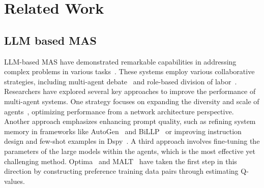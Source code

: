 \section{Related Work}
\label{section:relatedwork}



\subsection{LLM based MAS}
\label{subsection:LLM based MAS}
LLM-based MAS have demonstrated remarkable capabilities in addressing complex problems in various tasks~\cite{DBLP:conf/iclr/HongZCZCWZWYLZR24, DBLP:conf/acl/IslamAP24, tran2025multiagentcollaborationmechanismssurvey}. These systems employ various collaborative strategies, including multi-agent debate~\cite{DBLP:conf/icml/Du00TM24, DBLP:conf/emnlp/Liang0JW00Y0T24} and role-based division of labor~\cite{DBLP:journals/corr/abs-2405-04219, DBLP:conf/naacl/WangMW0WJ24}. 
Researchers have explored several key approaches to improve the performance of multi-agent systems. One strategy focuses on expanding the diversity and scale of agents~\cite{DBLP:journals/corr/abs-2402-05120, DBLP:conf/acl/QianLLCDL0CSCXL24, DBLP:journals/corr/abs-2406-04692}, optimizing performance from a network architecture perspective. Another approach emphasizes enhancing prompt quality, such as refining system memory in frameworks like AutoGen~\cite{DBLP:journals/corr/abs-2308-08155} and BiLLP~\cite{DBLP:conf/sigir/Shi0ZGLZWF24} or improving instruction design and few-shot examples in Dspy~\cite{DBLP:journals/corr/abs-2310-03714, DBLP:conf/emnlp/Opsahl-OngRPBPZ24}. A third approach involves fine-tuning the parameters of the large models within the agents, which is the most effective yet challenging method. Optima~\cite{DBLP:journals/corr/abs-2410-08115} and MALT~\cite{DBLP:journals/corr/abs-2412-01928} have taken the first step in this direction by constructing preference training data pairs through estimating Q-values.


